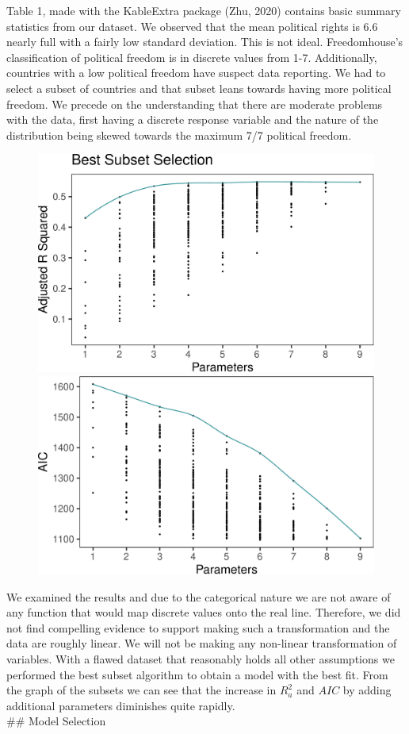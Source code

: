 \documentclass[
  english,
  man,floatsintext]{apa6}
\begin{document}
Table 1, made with the KableExtra package (Zhu, 2020) contains basic summary statistics from our dataset. We observed that the mean political rights is 6.6 nearly full with a fairly low standard deviation. This is not ideal. Freedomhouse's classification of political freedom is in discrete values from 1-7. Additionally, countries with a low political freedom have suspect data reporting. We had to select a subset of countries and that subset leans towards having more political freedom. We precede on the understanding that there are moderate problems with the data, first having a discrete response variable and the nature of the distribution being skewed towards the maximum 7/7 political freedom.

\begin{figure}
\includegraphics[width=0.5\linewidth]{paper_files/figure-latex/unnamed-chunk-3-1} \includegraphics[width=0.5\linewidth]{paper_files/figure-latex/unnamed-chunk-3-2} \caption{ }\label{fig:unnamed-chunk-3}
\end{figure}

We examined the results and due to the categorical nature we are not aware of any function that would map discrete values onto the real line. Therefore, we did not find compelling evidence to support making such a transformation and the data are roughly linear. We will not be making any non-linear transformation of variables. With a flawed dataset that reasonably holds all other assumptions we performed the best subset algorithm to obtain a model with the best fit. From the graph of the subsets we can see that the increase in \(R^{2}_a\) and \(AIC\) by adding additional parameters diminishes quite rapidly.\\
\#\# Model Selection
\end{document}
